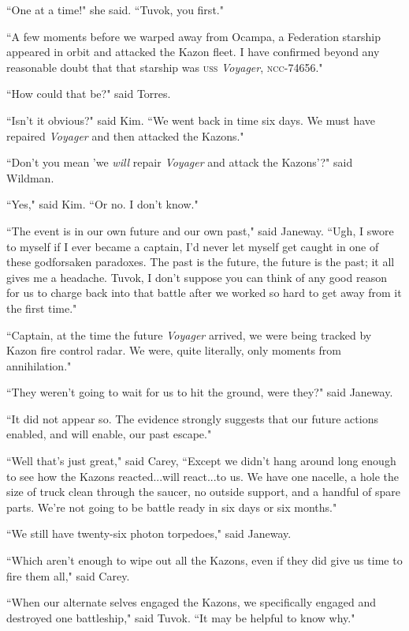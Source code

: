 \documentclass[twoside,letterpaper,12pt]{memoir}
\begin{document}
``One at a time!" she said. ``Tuvok, you first." 

``A few moments before we warped away from Ocampa, a Federation starship appeared in orbit and attacked the Kazon fleet. I have confirmed beyond any reasonable doubt that that starship was \textsc{uss} \textit{Voyager}, \textsc{ncc}-74656." 

``How could that be?" said Torres. 

``Isn't it obvious?" said Kim. ``We went back in time six days. We must have repaired \textit{Voyager} and then attacked the Kazons." 

``Don't you mean 'we \textit{will} repair \textit{Voyager} and attack the Kazons'?" said Wildman. 

``Yes," said Kim. ``Or no. I don't know." 

``The event is in our own future and our own past," said Janeway. ``Ugh, I swore to myself if I ever became a captain, I'd never let myself get caught in one of these godforsaken paradoxes. The past is the future, the future is the past; it all gives me a headache. Tuvok, I don't suppose you can think of any good reason for us to charge back into that battle after we worked so hard to get away from it the first time." 

``Captain, at the time the future \textit{Voyager} arrived, we were being tracked by Kazon fire control radar. We were, quite literally, only moments from annihilation." 

``They weren't going to wait for us to hit the ground, were they?" said Janeway. 

``It did not appear so. The evidence strongly suggests that our future actions enabled, and will enable, our past escape." 

``Well that's just great," said Carey, ``Except we didn't hang around long enough to see how the Kazons reacted...will react...to us. We have one nacelle, a hole the size of truck clean through the saucer, no outside support, and a handful of spare parts. We're not going to be battle ready in six days or six months." 

``We still have twenty-six photon torpedoes," said Janeway. 

``Which aren't enough to wipe out all the Kazons, even if they did give us time to fire them all," said Carey. 

``When our alternate selves engaged the Kazons, we specifically engaged and destroyed one battleship," said Tuvok. ``It may be helpful to know why." 
\end{document}
